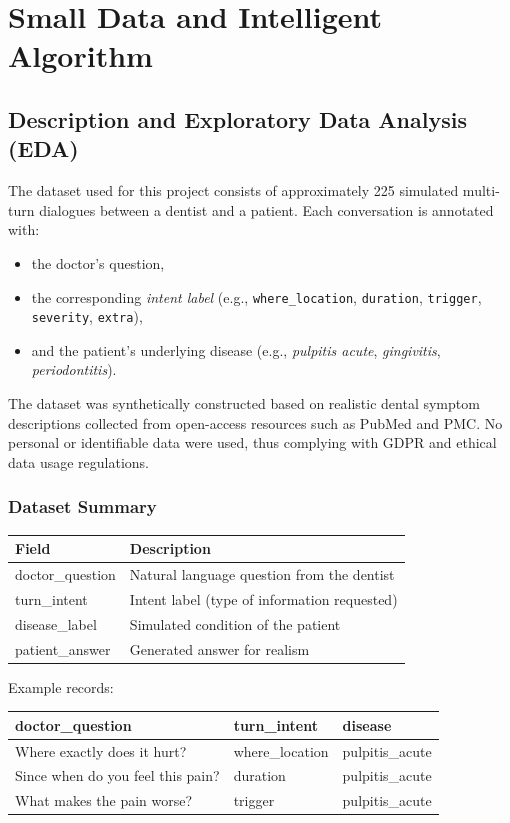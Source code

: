 \section{Small Data and Intelligent Algorithm}

\subsection{Description and Exploratory Data Analysis (EDA)}

The dataset used for this project consists of approximately 225 simulated multi-turn dialogues between a dentist and a patient. Each conversation is annotated with:
\begin{itemize}
    \item the doctor's question,
    \item the corresponding \textit{intent label} (e.g., \texttt{where\_location}, \texttt{duration}, \texttt{trigger}, \texttt{severity}, \texttt{extra}),
    \item and the patient's underlying disease (e.g., \textit{pulpitis acute}, \textit{gingivitis}, \textit{periodontitis}).
\end{itemize}

The dataset was synthetically constructed based on realistic dental symptom descriptions collected from open-access resources such as PubMed and PMC. No personal or identifiable data were used, thus complying with GDPR and ethical data usage regulations.

\subsubsection*{Dataset Summary}
\begin{center}
\begin{tabular}{|l|l|}
\hline
\textbf{Field} & \textbf{Description} \\
\hline
doctor\_question & Natural language question from the dentist \\
turn\_intent & Intent label (type of information requested) \\
disease\_label & Simulated condition of the patient \\
patient\_answer & Generated answer for realism \\
\hline
\end{tabular}
\end{center}

Example records:
\begin{center}
\begin{tabular}{|l|l|l|}
\hline
doctor\_question & turn\_intent & disease \\
\hline
Where exactly does it hurt? & where\_location & pulpitis\_acute \\
Since when do you feel this pain? & duration & pulpitis\_acute \\
What makes the pain worse? & trigger & pulpitis\_acute \\
\hline
\end{tabular}
\end{center}

